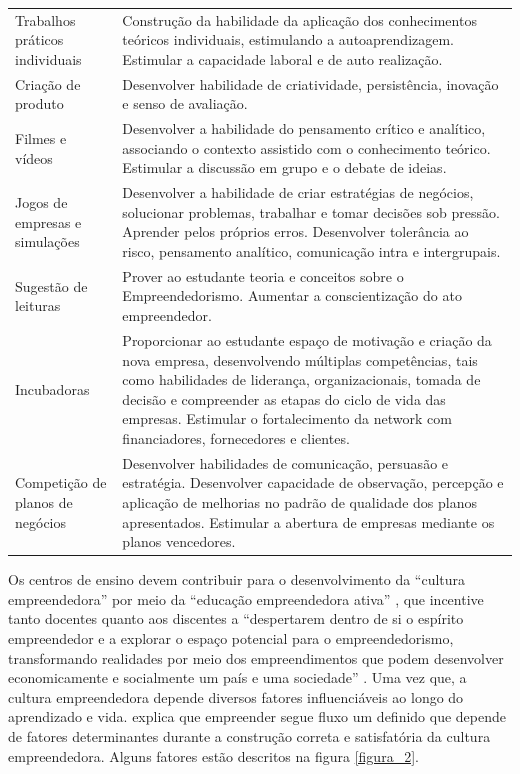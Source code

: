 \begin{longtable}{p{3.5cm}p{11.0cm}}
Trabalhos práticos individuais & Construção da habilidade da aplicação dos conhecimentos teóricos
individuais, estimulando a autoaprendizagem. Estimular a capacidade
laboral e de auto realização. \\ 

Criação de produto & Desenvolver habilidade de criatividade, persistência, inovação e senso de
avaliação. \\ 

Filmes e vídeos & Desenvolver a habilidade do pensamento crítico e analítico, associando o
contexto assistido com o conhecimento teórico. Estimular a discussão em grupo e o debate de ideias. \\ 

Jogos de empresas e simulações & Desenvolver a habilidade de criar estratégias de negócios, solucionar
problemas, trabalhar e tomar decisões sob pressão. Aprender pelos próprios erros. Desenvolver tolerância ao risco, pensamento analítico, comunicação intra e intergrupais. \\ 

Sugestão de leituras & Prover ao estudante teoria e conceitos sobre o Empreendedorismo. Aumentar a conscientização do ato empreendedor. \\ 
Incubadoras & Proporcionar ao estudante espaço de motivação e criação da nova empresa, desenvolvendo múltiplas competências, tais como habilidades de liderança, organizacionais, tomada de decisão e compreender as etapas do ciclo de vida das empresas. Estimular o fortalecimento da network com financiadores, fornecedores e clientes. \\

Competição de planos de negócios & Desenvolver habilidades de comunicação, persuasão e estratégia.
Desenvolver capacidade de observação, percepção e aplicação de melhorias no padrão de qualidade dos planos apresentados. Estimular a abertura de empresas mediante os planos vencedores. \\ 

\end{longtable}




Os centros de ensino devem contribuir para o desenvolvimento da “cultura empreendedora” por meio da “educação empreendedora ativa” \cite{tscha_empreendendo_2014}, que incentive tanto docentes quanto aos discentes a “despertarem dentro de si o espírito empreendedor e a explorar o espaço potencial para o empreendedorismo, transformando realidades por meio dos empreendimentos que podem desenvolver economicamente e socialmente um país e uma sociedade” \cite{tscha_empreendendo_2014}. Uma vez que, a cultura empreendedora depende diversos fatores influenciáveis ao longo do aprendizado e vida. \cite{dornelas_empreendedorismo_2005} explica que  empreender segue fluxo um definido que depende de fatores determinantes durante a construção correta e satisfatória da cultura empreendedora. Alguns fatores estão descritos na figura \ref{figura_2}.

